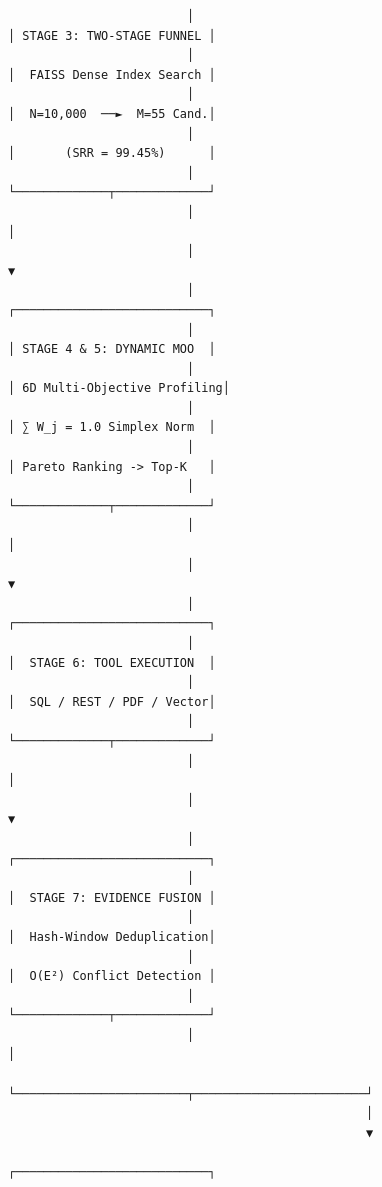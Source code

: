 \begin{figure}[t]
\begin{minipage}{0.98\textwidth}
\begin{verbatim}
                         │                                   │ STAGE 3: TWO-STAGE FUNNEL │
                         │                                   │  FAISS Dense Index Search │
                         │                                   │  N=10,000  ──►  M=55 Cand.│
                         │                                   │       (SRR = 99.45%)      │
                         │                                   └─────────────┬─────────────┘
                         │                                                 │
                         │                                                 ▼
                         │                                   ┌───────────────────────────┐
                         │                                   │ STAGE 4 & 5: DYNAMIC MOO  │
                         │                                   │ 6D Multi-Objective Profiling│
                         │                                   │ ∑ W_j = 1.0 Simplex Norm  │
                         │                                   │ Pareto Ranking -> Top-K   │
                         │                                   └─────────────┬─────────────┘
                         │                                                 │
                         │                                                 ▼
                         │                                   ┌───────────────────────────┐
                         │                                   │  STAGE 6: TOOL EXECUTION  │
                         │                                   │  SQL / REST / PDF / Vector│
                         │                                   └─────────────┬─────────────┘
                         │                                                 │
                         │                                                 ▼
                         │                                   ┌───────────────────────────┐
                         │                                   │  STAGE 7: EVIDENCE FUSION │
                         │                                   │  Hash-Window Deduplication│
                         │                                   │  O(E²) Conflict Detection │
                         │                                   └─────────────┬─────────────┘
                         │                                                 │
                         └────────────────────────┬────────────────────────┘
                                                  │
                                                  ▼
                                    ┌───────────────────────────┐

\end{verbatim}
\end{minipage}
\end{figure}

